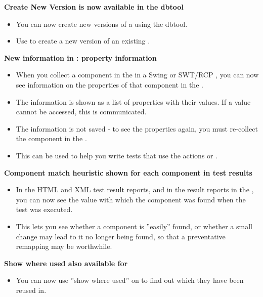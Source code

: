 \textbf{Create New Version is now available in the dbtool}
\begin{itemize}
\item You can now create new versions of a \gdproject{} using the dbtool.
\item Use  to create a new version of an existing \gdproject{}.
\end{itemize}

\textbf{New information in \gdomm{} : property information}
\begin{itemize}
\item When you collect a component in the \gdomm{} in a Swing or SWT/RCP \gdaut{}, you can now see information on the properties of that component in the \gdpropview{}.
\item The information is shown as a list of properties with their values. If a value cannot be accessed, this is communicated.
\item The information is not saved - to see the properties again, you must re-collect the component in the \gdomm{}.
\item This can be used to help you write tests that use the actions  or .
\end{itemize}

\textbf{Component match heuristic shown for each component in test results}
\begin{itemize}
\item In the HTML and XML test result reports, and in the result reports in the \ite{}, you can now see the value with which the component was found when the test was executed.
\item This lets you see whether a component is ''easily'' found, or whether a small change may lead to it no longer being found, so that a preventative remapping may be worthwhile.
\end{itemize}

\textbf{Show where used also available for \gdsuites{}}
\begin{itemize}
\item You can now use ''show where used'' on \gdsuites{} to find out which \gdjobs{} they have been reused in.
\end{itemize}

